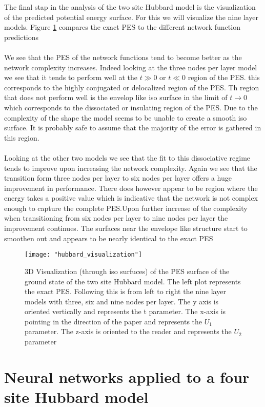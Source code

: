 \documentclass[12pt]{article}
\begin{document}
The final stap in the analysis of the two site Hubbard model is the visualization of the predicted potential energy surface. For this we will visualize the nine layer models. Figure \ref{fig:PES} compares the exact PES to the different network function predictions 
\\
\\
We see that the PES of the network functions tend to become better as the network complexity increases. Indeed looking at the three nodes per layer model we see that it tends to perform well at the $t\gg0$ or $t\ll0$ region of the PES. this corresponds to the highly conjugated or delocalized region of the PES. Th region that does not perform well is the envelop like iso surface in the limit of $t\rightarrow0$ which corresponds to the dissociated or insulating region of the PES. Due to the complexity of the shape the model seems to be unable to create a smooth iso surface. It is probably safe to assume that the majority of the error is gathered in this region.
\\
\\
Looking at the other two models we see that the fit to this dissociative regime tends to improve upon increasing the network complexity. Again we see that the transition form three nodes per layer to six nodes per layer offers a huge improvement in performance. There does however appear to be region where the energy takes a positive value which is indicative that the network is not complex enough to capture the complete PES.Upon further increase of the complexity when transitioning from six nodes per layer to nine nodes per layer the improvement continues. The surfaces near the envelope like structure start to smoothen out and appears to be nearly identical to the exact PES
\begin{figure}[H]
	\texttt{[image: "hubbard\_visualization"]}
	\caption{ 3D Visualization (through iso surfuces) of the PES surface of the ground state of the two site Hubbard model. The left plot represents the exact PES. Following this is from left to right the nine layer models with three, six and nine nodes per layer. The y axis is oriented vertically and represents the t parameter. The x-axis is pointing in the direction of the paper and represents the $U_1$ parameter. The z-axis is oriented to the reader and represents the $U_2$ parameter}
	\label{fig:PES}
\end{figure}

\newpage
\section{Neural networks applied to a four site Hubbard model}
\end{document}

